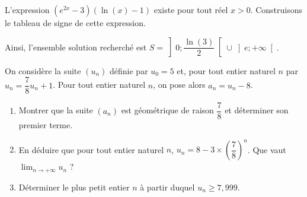 \documentclass[11pt,fleqn, openany]{book} %
\begin{document}
\begin{solution}

L'expression \((e^{2x}-3)(\ln(x)-1)\) existe pour tout réel \(x > 0\). Construisons le tableau de signe de cette expression.


\begin{center}\end{center}


Ainsi, l'ensemble solution recherché est \(S=\left]0;\dfrac{\ln(3)}{2}\right[ \cup \left]e;+\infty\right[\).

\end{solution}




\begin{exercise}On considère la suite $(u_n)$ définie par $u_0=5$ et, pour tout entier naturel $n$ par $u_n=\dfrac{7}{8}u_n+1$. Pour tout entier naturel $n$, on pose alors $a_n=u_n-8$.
\begin{enumerate}
\item Montrer que la suite $(a_n)$ est géométrique de raison $\dfrac{7}{8}$ et déterminer son premier terme.
\item En déduire que pour tout entier naturel $n$, $u_n=8-3\times\left(\dfrac{7}{8}\right)^n$. Que vaut $\displaystyle\lim_{n \to +\infty}u_n$ ?
\item Déterminer le plus petit entier $n$ à partir duquel $u_n \geqslant 7,999$.
\end{enumerate}\end{exercise}
\end{document}
